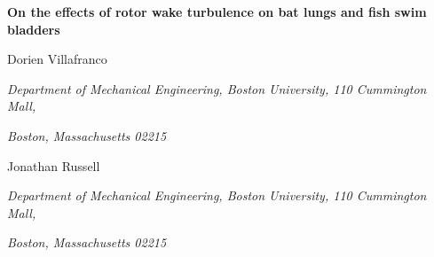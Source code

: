 \documentclass{article}
\begin{document}
\noindent\LARGE{\textbf{On the effects of rotor wake turbulence on bat lungs and fish swim bladders}}
\vspace{0.3cm}
\normalsize

\hspace{0.5cm}Dorien Villafranco

\small\hspace{0.5cm}\textit{Department of Mechanical Engineering, Boston University, 110 Cummington Mall,}

\hspace{0.5cm}\textit{Boston, Massachusetts 02215}
\normalsize
\vspace{0.15cm}

\hspace{0.5cm}Jonathan Russell
\small

\hspace{0.5cm}\textit{Department of Mechanical Engineering, Boston University, 110 Cummington Mall,}

\hspace{0.5cm}\textit{Boston, Massachusetts 02215}
\end{document}
